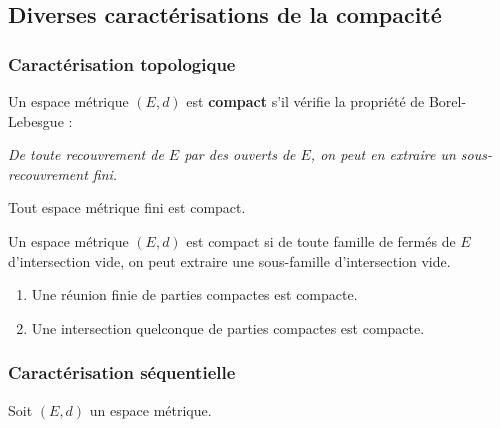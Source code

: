 



  \subsection{Diverses caractérisations de la compacité}

  \subsubsection{Caractérisation topologique}


  \begin{definition}
    Un espace métrique $(E, d)$ est \textbf{compact} s'il vérifie la propriété de Borel-Lebesgue :
    \begin{center}
      \textit{De toute recouvrement de $E$ par des ouverts de $E$, on peut en extraire un sous-recouvrement fini.}
    \end{center}
  \end{definition}

  \begin{example}
    Tout espace métrique fini est compact.
  \end{example}

  \begin{proposition}
    Un espace métrique $(E, d)$ est compact si de toute famille de fermés de $E$ d'intersection vide, on peut extraire une sous-famille d'intersection vide.
  \end{proposition}

  \begin{proposition}
    \begin{enumerate}[label=(\roman*)]
      \item Une réunion finie de parties compactes est compacte.
      \item Une intersection quelconque de parties compactes est compacte.
    \end{enumerate}
  \end{proposition}

  \subsubsection{Caractérisation séquentielle}


  Soit $(E,d)$ un espace métrique.

